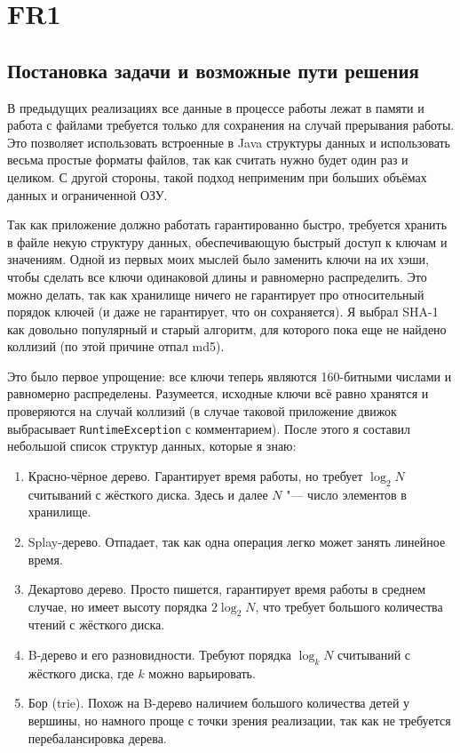 \documentclass[a4paper]{article}
\renewcommand{\t}{\texttt}
\begin{document}
\section{FR1}
\subsection{Постановка задачи и возможные пути решения}
  В предыдущих реализациях все данные в процессе работы лежат в памяти и работа с файлами требуется
  только для сохранения на случай прерывания работы. Это позволяет использовать встроенные в Java
  структуры данных и использовать весьма простые форматы файлов, так как считать нужно будет один раз и целиком.
  С другой стороны, такой подход неприменим при больших объёмах данных и ограниченной ОЗУ.

  Так как приложение должно работать гарантированно быстро, требуется хранить в файле некую структуру данных,
  обеспечивающую быстрый доступ к ключам и значениям. Одной из первых моих мыслей было заменить ключи
  на их хэши, чтобы сделать все ключи одинаковой длины и равномерно распределить. Это можно делать, так
  как хранилище ничего не гарантирует про относительный порядок ключей (и даже не гарантирует, что он сохраняется).
  Я выбрал SHA-1 как довольно популярный и старый алгоритм, для которого пока еще не найдено коллизий (по этой причине отпал md5).

  Это было первое упрощение: все ключи теперь являются 160-битными числами и равномерно распределены. Разумеется,
  исходные ключи всё равно хранятся и проверяются на случай коллизий (в случае таковой приложение движок выбрасывает
  \t{RuntimeException} с комментарием). После этого я составил небольшой список структур данных, которые я знаю:

  \begin{enumerate}
  \item Красно-чёрное дерево. Гарантирует время работы, но требует $\log_2 N$ считываний с жёсткого диска. Здесь
        и далее $N$ "--- число элементов в хранилище.
  \item Splay-дерево. Отпадает, так как одна операция легко может занять линейное время.
  \item Декартово дерево. Просто пишется, гарантирует время работы в среднем случае, но имеет высоту
        порядка $2 \log_2 N$, что требует большого количества чтений с жёсткого диска.
  \item B-дерево и его разновидности. Требуют порядка $\log_k N$ считываний с жёсткого диска, где $k$ можно
        варьировать.
  \item Бор (trie). Похож на B-дерево наличием большого количества детей у вершины, но намного проще с
        точки зрения реализации, так как не требуется перебалансировка дерева.
  \end{enumerate}
\end{document}
